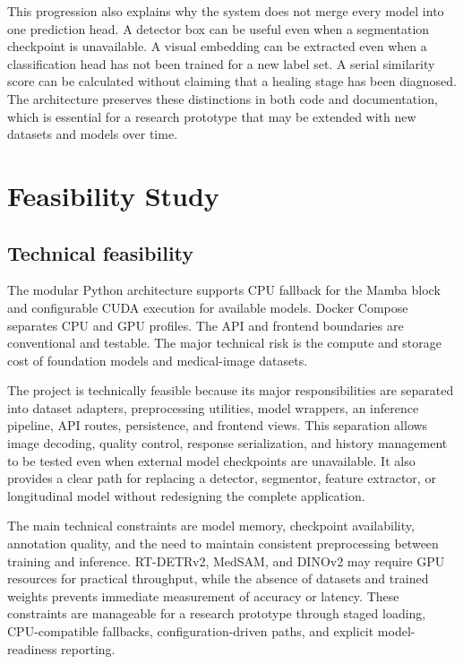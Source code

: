 \documentclass[12pt,a4paper]{article}
\begin{document}
This progression also explains why the system does not merge every model into one prediction head. A detector box can be useful even when a segmentation checkpoint is unavailable. A visual embedding can be extracted even when a classification head has not been trained for a new label set. A serial similarity score can be calculated without claiming that a healing stage has been diagnosed. The architecture preserves these distinctions in both code and documentation, which is essential for a research prototype that may be extended with new datasets and models over time.

\renewcommand{\thetable}{\arabic{table}}

\clearpage
\section{Feasibility Study}
\subsection{Technical feasibility}
The modular Python architecture supports CPU fallback for the Mamba block and configurable CUDA execution for available models. Docker Compose separates CPU and GPU profiles. The API and frontend boundaries are conventional and testable. The major technical risk is the compute and storage cost of foundation models and medical-image datasets.

The project is technically feasible because its major responsibilities are separated into dataset adapters, preprocessing utilities, model wrappers, an inference pipeline, API routes, persistence, and frontend views. This separation allows image decoding, quality control, response serialization, and history management to be tested even when external model checkpoints are unavailable. It also provides a clear path for replacing a detector, segmentor, feature extractor, or longitudinal model without redesigning the complete application.

The main technical constraints are model memory, checkpoint availability, annotation quality, and the need to maintain consistent preprocessing between training and inference. RT-DETRv2, MedSAM, and DINOv2 may require GPU resources for practical throughput, while the absence of datasets and trained weights prevents immediate measurement of accuracy or latency. These constraints are manageable for a research prototype through staged loading, CPU-compatible fallbacks, configuration-driven paths, and explicit model-readiness reporting.
\end{document}
